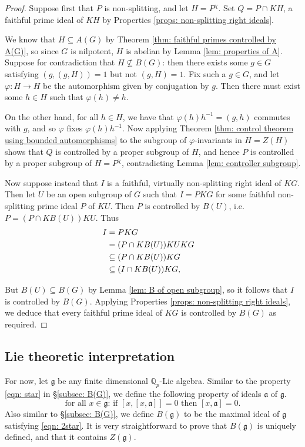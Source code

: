 \documentclass[12pt,a4paper]{article}
\let\\=\cr
\theoremstyle{definition}
\theoremstyle{remark}
\theoremstyle{custthm}
\begin{document}
\begin{proof}
Suppose first that $P$ is non-splitting, and let $H = P^\chi$. Set $Q = P\cap KH$, a faithful prime ideal of $KH$ by Properties \ref{props: non-splitting right ideals}.

We know that $H\subseteq A(G)$ by Theorem \ref{thm: faithful primes controlled by A(G)}, so since $G$ is nilpotent, $H$ is abelian by Lemma \ref{lem: properties of A}. Suppose for contradiction that $H\not\subseteq B(G)$: then there exists some $g\in G$ satisfying $(g,(g,H)) = 1$ but not $(g,H) = 1$. Fix such a $g\in G$, and let $\varphi: H\to H$ be the automorphism given by conjugation by $g$. Then there must exist some $h\in H$ such that $\varphi(h) \neq h$. 

On the other hand, for all $h\in H$, we have that $\varphi(h)h^{-1} = (g,h)$ commutes with $g$, and so $\varphi$ fixes $\varphi(h)h^{-1}$. Now applying Theorem \ref{thm: control theorem using bounded automorphisms} to the subgroup of $\varphi$-invariants in $H = Z(H)$ shows that $Q$ is controlled by a proper subgroup of $H$, and hence $P$ is controlled by a proper subgroup of $H=P^\chi$, contradicting Lemma \ref{lem: controller subgroup}.

Now suppose instead that $I$ is a faithful, virtually non-splitting right ideal of $KG$. Then let $U$ be an open subgroup of $G$ such that $I = PKG$ for some faithful non-splitting prime ideal $P$ of $KU$. Then $P$ is controlled by $B(U)$, i.e. $P=(P\cap KB(U))KU$. Thus 
\begin{align*}
I &= PKG\\
&= (P\cap KB(U))KUKG\\
&\subseteq (P\cap KB(U))KG\\
&\subseteq (I\cap KB(U))KG,
\end{align*}

But $B(U)\subseteq B(G)$ by Lemma \ref{lem: B of open subgroup}, so it follows that $I$ is controlled by $B(G)$. Applying Properties \ref{props: non-splitting right ideals}, we deduce that every faithful prime ideal of $KG$ is controlled by $B(G)$ as required.\end{proof}

\subsection{Lie theoretic interpretation}\label{subsec: Lie theory}

For now, let $\mathfrak{g}$ be any finite dimensional $\mathbb{Q}_p$-Lie algebra. Similar to the property \eqref{eqn: star} in \S \ref{subsec: B(G)}, we define the following property of ideals $\mathfrak{a}$ of $\mathfrak{g}$.
\begin{equation}\label{eqn: 2star}
\tag{$**$}
\text{for all } x\in \mathfrak{g}:\, \text{if } [x,[x,\mathfrak{a}]] = 0 \text{ then } [x,\mathfrak{a}] = 0.
\end{equation}
Also similar to \S \ref{subsec: B(G)}, we define $B(\mathfrak{g})$ to be the maximal ideal of $\mathfrak{g}$ satisfying \eqref{eqn: 2star}. It is very straightforward to prove that $B(\mathfrak{g})$ is uniquely defined, and that it contains $Z(\mathfrak{g})$.
\end{document}
